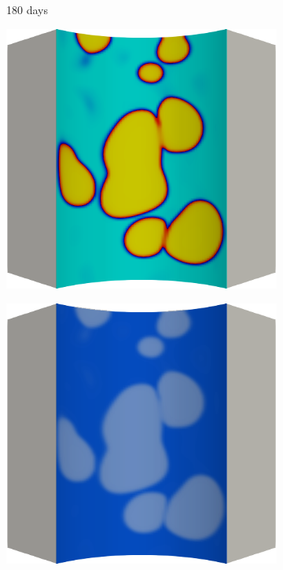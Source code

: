\begin{figure}[!htbp]
  \begin{subfigure}{0.15\textwidth}
    \centering
    \caption*{180 days}
  \end{subfigure}
  \begin{subfigure}{0.19\textwidth}
    \centering
    \includegraphics[width=\textwidth]{Chapter5/figures/spallation/c.0018}
  \end{subfigure}
  \hspace{0.06\textwidth}
  \begin{subfigure}{0.19\textwidth}
    \centering
    \includegraphics[width=\textwidth]{Chapter5/figures/spallation/d.0018}

\end{subfigure}
\end{figure}
